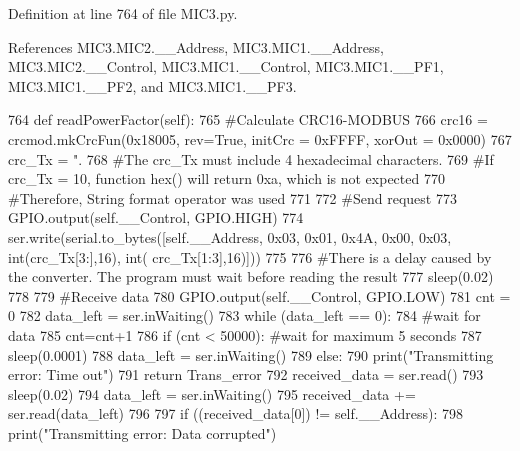Definition at line 764 of file M\+I\+C3.\+py.



References M\+I\+C3.\+M\+I\+C2.\+\_\+\+\_\+\+Address, M\+I\+C3.\+M\+I\+C1.\+\_\+\+\_\+\+Address, M\+I\+C3.\+M\+I\+C2.\+\_\+\+\_\+\+Control, M\+I\+C3.\+M\+I\+C1.\+\_\+\+\_\+\+Control, M\+I\+C3.\+M\+I\+C1.\+\_\+\+\_\+\+P\+F1, M\+I\+C3.\+M\+I\+C1.\+\_\+\+\_\+\+P\+F2, and M\+I\+C3.\+M\+I\+C1.\+\_\+\+\_\+\+P\+F3.


\begin{DoxyCode}
764     \textcolor{keyword}{def }readPowerFactor(self):
765         \textcolor{comment}{#Calculate CRC16-MODBUS
}
766         crc16 = crcmod.mkCrcFun(0x18005, rev=\textcolor{keyword}{True}, initCrc = 0xFFFF, xorOut = 0x0000)
767         crc\_Tx = \textcolor{stringliteral}{".%
768         \textcolor{comment}{#The crc\_Tx must include 4 hexadecimal characters.
}
769         \textcolor{comment}{#If crc\_Tx =  10, function hex() will return 0xa, which is not expected
}
770         \textcolor{comment}{#Therefore, String format operator was used
}
771     
772         \textcolor{comment}{#Send request
}
773         GPIO.output(self.\_\_Control, GPIO.HIGH)
774         ser.write(serial.to\_bytes([self.\_\_Address, 0x03, 0x01, 0x4A, 0x00, 0x03, int(crc\_Tx[3:],16), int(
      crc\_Tx[1:3],16)]))
775     
776         \textcolor{comment}{#There is a delay caused by the converter. The program must wait before reading the result
}
777         sleep(0.02)
778     
779         \textcolor{comment}{#Receive data
}
780         GPIO.output(self.\_\_Control, GPIO.LOW)
781         cnt = 0
782         data\_left = ser.inWaiting()
783         \textcolor{keywordflow}{while} (data\_left == 0):
784             \textcolor{comment}{#wait for data
}
785             cnt=cnt+1
786             \textcolor{keywordflow}{if} (cnt < 50000): \textcolor{comment}{#wait for maximum 5 seconds
}
787                 sleep(0.0001)
788                 data\_left = ser.inWaiting()
789             \textcolor{keywordflow}{else}:
790                 print(\textcolor{stringliteral}{"Transmitting error: Time out"})
791                 \textcolor{keywordflow}{return} Trans\_error
792         received\_data = ser.read()
793         sleep(0.02)
794         data\_left = ser.inWaiting()
795         received\_data += ser.read(data\_left)
796         
797         \textcolor{keywordflow}{if} ((received\_data[0]) != self.\_\_Address):
798             print(\textcolor{stringliteral}{"Transmitting error: Data corrupted"})
}
\end{DoxyCode}

